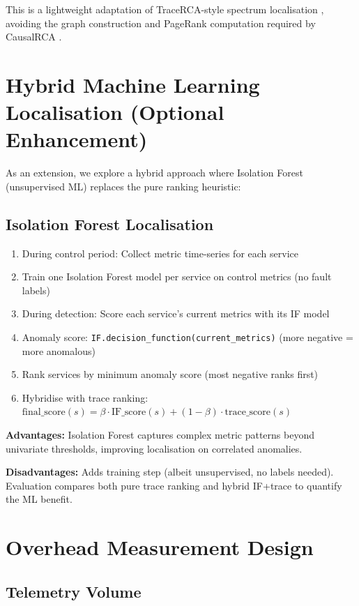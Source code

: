 This is a lightweight adaptation of TraceRCA-style spectrum localisation \citep{li2021tracerca}, avoiding the graph construction and PageRank computation required by CausalRCA \citep{xin2023causalrca}.

\section{Hybrid Machine Learning Localisation (Optional Enhancement)}

As an extension, we explore a hybrid approach where Isolation Forest (unsupervised ML) replaces the pure ranking heuristic:

\subsection{Isolation Forest Localisation}

\begin{enumerate}
    \item During control period: Collect metric time-series for each service
    \item Train one Isolation Forest model per service on control metrics (no fault labels)
    \item During detection: Score each service's current metrics with its IF model
    \item Anomaly score: \texttt{IF.decision\_function(current\_metrics)} (more negative = more anomalous)
    \item Rank services by minimum anomaly score (most negative ranks first)
    \item Hybridise with trace ranking: $\text{final\_score}(s) = \beta \cdot \text{IF\_score}(s) + (1-\beta) \cdot \text{trace\_score}(s)$
\end{enumerate}

\textbf{Advantages:} Isolation Forest captures complex metric patterns beyond univariate thresholds, improving localisation on correlated anomalies.

\textbf{Disadvantages:} Adds training step (albeit unsupervised, no labels needed). Evaluation compares both pure trace ranking and hybrid IF+trace to quantify the ML benefit.

\section{Overhead Measurement Design}

\subsection{Telemetry Volume}

